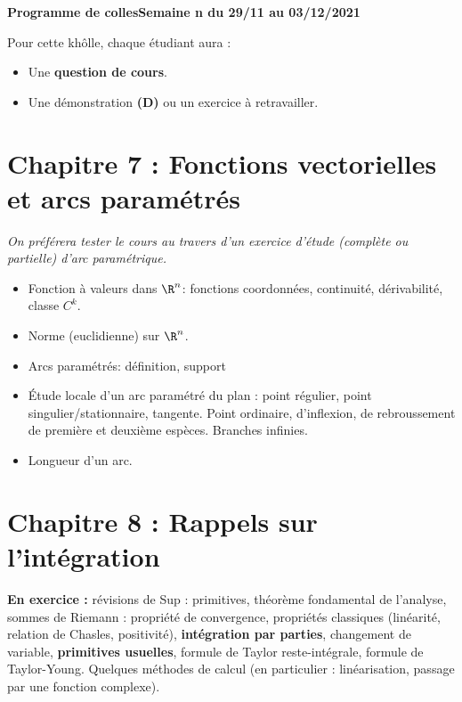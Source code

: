 \documentclass[twoside,a4paper,french,10pt]{VcCours}
\begin{document}

\begin{center}
\large\bf
Programme de collesSemaine n du 29/11 au 03/12/2021
\end{center}
\separationTitre


Pour cette khôlle, chaque étudiant aura :
\begin{itemize}
\item Une \textbf{question de cours}.
\item Une démonstration \textbf{(D)} ou un exercice à retravailler.
\end{itemize}


\section*{Chapitre 7 : Fonctions vectorielles et arcs paramétrés}
\emph{On préférera tester le cours au travers d'un exercice d'étude (complète ou partielle) d'arc paramétrique.}

\begin{itemize}
    \item Fonction à valeurs dans $\R^n$: fonctions coordonnées, continuité, dérivabilité, classe $C^k$.
    \item Norme (euclidienne) sur $\R^n$.
    \item Arcs paramétrés: définition, support
    \item Étude locale d’un arc paramétré du plan : point régulier, point 
    singulier/stationnaire, tangente. Point ordinaire, d'inflexion, de 
    rebroussement de première et deuxième espèces. Branches infinies.
    \item Longueur d’un arc.
\end{itemize} 

\section*{Chapitre 8 : Rappels sur l'intégration}
  
  \textbf{En exercice :} révisions de Sup : primitives, théorème fondamental de l'analyse, sommes de Riemann : propriété de convergence, propriétés classiques (linéarité, relation de Chasles, positivité), \textbf{intégration par parties}, changement de variable, \textbf{primitives usuelles}, formule de Taylor reste-intégrale, formule de Taylor-Young. Quelques méthodes de calcul (en particulier : linéarisation, passage par une fonction complexe).
\end{document}
